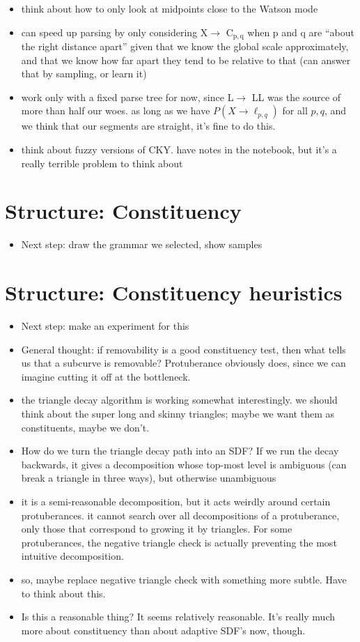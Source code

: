 \documentclass{book}
\begin{document}
\begin{itemize}
\item think about how to only look at midpoints close to the Watson mode
\item can speed up parsing by only considering X$\to$ C$_{\mathrm{p,q}}$ when p and q
    are ``about the right distance apart'' given that we know the global
    scale approximately, and that we know how far apart they tend to
    be relative to that (can answer that by sampling, or learn it)
\item work only with a fixed parse tree for now, since L$\to$ LL was the
    source of more than half our woes. as long as we have $P(X\to
    \ell_{p,q})$ for all $p,q$, and we think that our segments are
    straight, it's fine to do this.
\item think about fuzzy versions of CKY. have notes in the notebook, but
    it's a really terrible problem to think about
\end{itemize}
\section{Structure: Constituency}
\label{sec-3_4}

\begin{itemize}
\item Next step: draw the grammar we selected, show samples
\end{itemize}
\section{Structure: Constituency heuristics}
\label{sec-3_5}


\begin{itemize}
\item Next step: make an experiment for this
\item General thought: if removability is a good constituency test, then
    what tells us that a subcurve is removable? Protuberance obviously
    does, since we can imagine cutting it off at the bottleneck.
\item the triangle decay algorithm is working somewhat interestingly. we
    should think about the super long and skinny triangles; maybe we
    want them as constituents, maybe we don't.
\item How do we turn the triangle decay path into an SDF? If we run the
    decay backwards, it gives a decomposition whose top-most level is
    ambiguous (can break a triangle in three ways), but otherwise
    unambiguous
\item it is a semi-reasonable decomposition, but it acts weirdly around
    certain protuberances. it cannot search over all decompositions of
    a protuberance, only those that correspond to growing it by
    triangles. For some protuberances, the negative triangle check is
    actually preventing the most intuitive decomposition.
\item so, maybe replace negative triangle check with something more
    subtle. Have to think about this.
\item Is this a reasonable thing? It seems relatively reasonable. It's
    really much more about constituency than about adaptive SDF's now,
    though.
\end{itemize}
\end{document}
